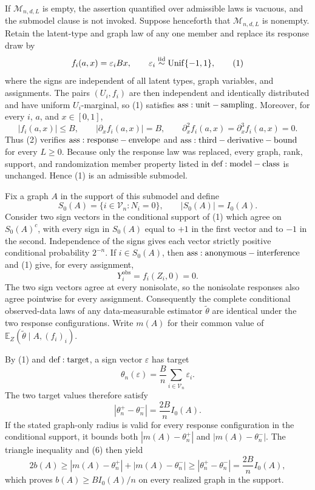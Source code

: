 If \(\mathcal M_{n,d,L}\) is empty, the assertion quantified over admissible laws is vacuous, and the submodel clause is not invoked.  Suppose henceforth that \(\mathcal M_{n,d,L}\) is nonempty.  Retain the latent-type and graph law of any one member and replace its response draw by
\[
 f_i(a,x)=\varepsilon_i Bx,
 \qquad
 \varepsilon_i\mathrel{\overset{\mathrm{iid}}{\sim}}{\rm Unif}\{-1,1\},
\tag{1}
\]
where the signs are independent of all latent types, graph variables, and assignments.  The pairs \((U_i,f_i)\) are then independent and identically distributed and have uniform \(U_i\)-marginal, so (1) satisfies \({\rm ass:unit-sampling}\).  Moreover, for every \(i\), \(a\), and \(x\in[0,1]\),
\[
 |f_i(a,x)|\le B,
 \qquad
 |\partial_x f_i(a,x)|=B,
 \qquad
 \partial_x^2 f_i(a,x)=\partial_x^3 f_i(a,x)=0.
\tag{2}
\]
Thus (2) verifies \({\rm ass:response-envelope}\) and \({\rm ass:third-derivative-bound}\) for every \(L\ge0\).  Because only the response law was replaced, every graph, rank, support, and randomization member property listed in \({\rm def:model-class}\) is unchanged.  Hence (1) is an admissible submodel.

Fix a graph \(A\) in the support of this submodel and define
\[
 S_0(A)=\{i\in\mathcal V_n:N_i=0\},
 \qquad
 |S_0(A)|=I_0(A).
\tag{3}
\]
Consider two sign vectors in the conditional support of (1) which agree on \(S_0(A)^c\), with every sign in \(S_0(A)\) equal to \(+1\) in the first vector and to \(-1\) in the second.  Independence of the signs gives each vector strictly positive conditional probability \(2^{-n}\).  If \(i\in S_0(A)\), then \({\rm ass:anonymous-interference}\) and (1) give, for every assignment,
\[
 Y_i^{\mathrm{obs}}=f_i(Z_i,0)=0.
\tag{4}
\]
The two sign vectors agree at every nonisolate, so the nonisolate responses also agree pointwise for every assignment.  Consequently the complete conditional observed-data laws of any data-measurable estimator \(\widetilde\theta\) are identical under the two response configurations.  Write \(m(A)\) for their common value of \(\mathbb E_Z(\widetilde\theta\mid A,(f_i)_i)\).

By (1) and \({\rm def:target}\), a sign vector \(\varepsilon\) has target
\[
 \theta_n(\varepsilon)=\frac{B}{n}\sum_{i\in\mathcal V_n}\varepsilon_i.
\tag{5}
\]
The two target values therefore satisfy
\[
 |\theta_n^+-\theta_n^-|=\frac{2B}{n}I_0(A).
\tag{6}
\]
If the stated graph-only radius is valid for every response configuration in the conditional support, it bounds both \(|m(A)-\theta_n^+|\) and \(|m(A)-\theta_n^-|\).  The triangle inequality and (6) then yield
\[
 2b(A)
 \ge |m(A)-\theta_n^+|+|m(A)-\theta_n^-|
 \ge |\theta_n^+-\theta_n^-|
 =\frac{2B}{n}I_0(A),
\tag{7}
\]
which proves \(b(A)\ge BI_0(A)/n\) on every realized graph in the support.

